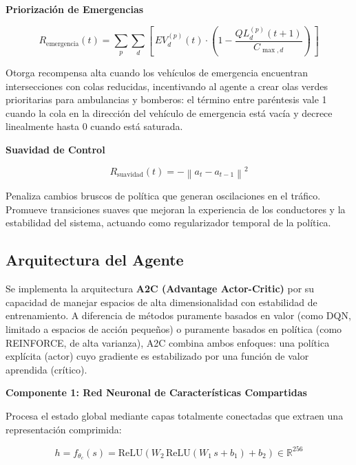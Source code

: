 \documentclass[12pt,a4paper,oneside]{report}
\begin{document}
\textbf{Priorización de Emergencias}

\begin{equation}
R_{\text{emergencia}}(t) = \sum_{p}\sum_{d}\left[\, EV_{d}^{(p)}(t) \cdot \left(1 - \frac{QL_{d}^{(p)}(t + 1)}{C_{\max,d}}\right) \,\right]
\label{eq:remergencia}
\end{equation}

Otorga recompensa alta cuando los vehículos de emergencia encuentran intersecciones con colas reducidas, incentivando al agente a crear olas verdes prioritarias para ambulancias y bomberos: el término entre paréntesis vale 1 cuando la cola en la dirección del vehículo de emergencia está vacía y decrece linealmente hasta 0 cuando está saturada.

\textbf{Suavidad de Control}

\begin{equation}
R_{\text{suavidad}}(t) = -\left\| a_{t} - a_{t - 1} \right\|^{2}
\label{eq:rsuavidad}
\end{equation}

Penaliza cambios bruscos de política que generan oscilaciones en el tráfico. Promueve transiciones suaves que mejoran la experiencia de los conductores y la estabilidad del sistema, actuando como regularizador temporal de la política.

\subsection{Arquitectura del Agente}\label{arquitectura-del-agente}

Se implementa la arquitectura \textbf{A2C (Advantage Actor-Critic)} por su capacidad de manejar espacios de alta dimensionalidad con estabilidad de entrenamiento. A diferencia de métodos puramente basados en valor (como DQN, limitado a espacios de acción pequeños) o puramente basados en política (como REINFORCE, de alta varianza), A2C combina ambos enfoques: una política explícita (actor) cuyo gradiente es estabilizado por una función de valor aprendida (crítico).

\textbf{Componente 1: Red Neuronal de Características Compartidas}

Procesa el estado global mediante capas totalmente conectadas que extraen una representación comprimida:

\begin{equation}
h = f_{\theta_{c}}(s) = \mathrm{ReLU}\!\left(W_{2}\,\mathrm{ReLU}\!\left(W_{1}\,s + b_{1}\right) + b_{2}\right) \in \mathbb{R}^{256}
\label{eq:shared}
\end{equation}
\end{document}
